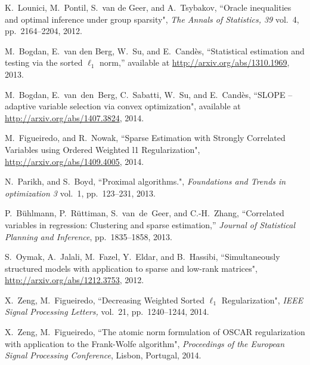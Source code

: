 \documentclass{article}
\begin{document}
\begin{thebibliography}{20}
		 K.~Lounici, M.~Pontil, S.~van de Geer, and A.~Tsybakov, ``Oracle inequalities and optimal inference under group sparsity", \emph{The Annals of Statistics, 39} vol.~4, pp.~2164--2204, 2012.
		
		
		M.~Bogdan, E.~van den Berg, W.~Su, and E.~Cand\`{e}s, ``Statistical estimation and testing via the sorted $\ell_1$ norm,''  available at \url{http://arxiv.org/abs/1310.1969}, 2013.
		
		M.~Bogdan, E.~van~den~Berg, C.~Sabatti, W.~Su, and E.~Cand\`{e}s, ``SLOPE -- adaptive variable selection via convex optimization", available at \url{http://arxiv.org/abs/1407.3824}, 2014.
		
		
		 M.~Figueiredo, and R.~Nowak, ``Sparse Estimation with Strongly Correlated Variables using Ordered Weighted l1 Regularization", \url{http://arxiv.org/abs/1409.4005}, 2014.
		
		 N.~Parikh, and S.~Boyd, ``Proximal algorithms.", {\em Foundations and Trends in optimization 3} vol.~1, pp.~123--231, 2013.
		
		P.~B\"{u}hlmann, P.~R\"{u}ttiman, S.~van~de~Geer, and C.-H.~Zhang, ``Correlated variables in regression: Clustering and sparse estimation,'' {\em Journal of Statistical Planning and Inference}, pp.~1835--1858, 2013.
		
		
		 S.~Oymak, A.~Jalali, M.~Fazel, Y.~Eldar, and B.~Hassibi, ``Simultaneously structured models with application to sparse and low-rank matrices", \url{http://arxiv.org/abs/1212.3753}, 2012.
		
		X.~Zeng, M.~Figueiredo, ``Decreasing Weighted Sorted $\ell_1$ Regularization", {\em IEEE Signal Processing Letters,} vol.~21, pp.~1240--1244, 2014.
		
		X.~Zeng, M.~Figueiredo, ``The atomic norm formulation of OSCAR regularization with application to the Frank-Wolfe algorithm", {\em Proceedings of the European Signal Processing Conference}, Lisbon, Portugal, 2014.
		
		
		
	\end{thebibliography}

	
\end{document}
